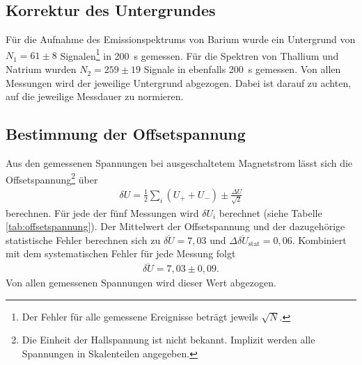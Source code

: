 \subsection{Korrektur des Untergrundes}
Für die Aufnahme des Emissionspektrums von Barium wurde ein Untergrund von $N_1=61\pm 8$ Signalen\footnote{Der Fehler für alle gemessene Ereignisse beträgt jeweils $\sqrt{N}$.} in \SI{200}{\second} gemessen. Für die Spektren von Thallium und Natrium wurden $N_2=259 \pm 19$ Signale in ebenfalls \SI{200}{\second} gemessen. Von allen Messungen wird der jeweilige Untergrund abgezogen. Dabei ist darauf zu achten, auf die jeweilige Messdauer zu normieren. 

\subsection{Bestimmung der Offsetspannung}
Aus den gemessenen Spannungen bei ausgeschaltetem Magnetstrom lässt sich die Offsetspannung\footnote{Die Einheit der Hallspannung ist nicht bekannt. Implizit werden alle Spannungen in Skalenteilen angegeben.} über
\begin{align*}
  \delta U=\frac{1}{2}\sum_i (U_++U_-) \pm \frac{\Delta U}{\sqrt{2}}
\end{align*}
berechnen. Für jede der fünf Messungen wird $\delta U_i$ berechnet (siehe Tabelle \ref{tab:offsetspannung}). Der Mittelwert der Offsetspannung und der dazugehörige statistische Fehler berechnen sich zu $\overline{\delta U}=7,03$ und $\Delta \overline{\delta U}_\mathrm{stat}=0,06$. Kombiniert mit dem systematischen Fehler für jede Messung folgt 
\begin{align*}
  \overline{\delta U}=7,03 \pm 0,09.
\end{align*} 
Von allen gemessenen Spannungen wird dieser Wert abgezogen.

